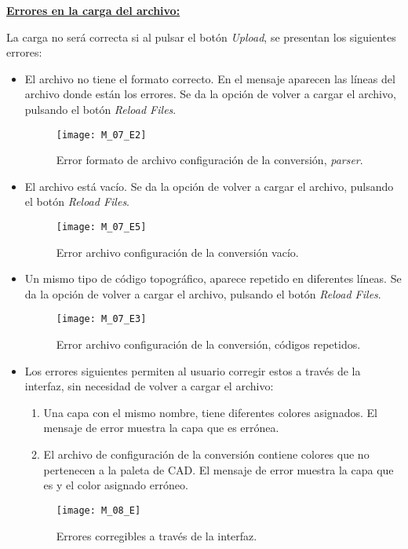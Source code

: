 \textbf{\underline{Errores en la carga del archivo:} } 

La carga no será correcta si al pulsar el botón \emph{Upload}, se presentan los siguientes errores:

\begin{itemize}


\item El archivo no tiene el formato correcto. En el mensaje aparecen las líneas del archivo donde están los errores. Se da la opción de volver a cargar el archivo, pulsando el botón \emph{Reload Files}.

\begin{figure}[H]
	\centering
	\texttt{[image: M\_07\_E2]}
	\caption{Error formato de archivo configuración de la conversión, \emph{parser}.}
	\label{fig:M_07_E2}
\end{figure}

\item El archivo está vacío. Se da la opción de volver a cargar el archivo, pulsando el botón \emph{Reload Files}.

\begin{figure}[H]
	\centering
	\texttt{[image: M\_07\_E5]}
	\caption{Error archivo configuración de la conversión vacío.}
	\label{fig:M_07_E5}
\end{figure}

\item Un mismo tipo de código topográfico, aparece repetido en diferentes líneas. Se da la opción de volver a cargar el archivo, pulsando el botón \emph{Reload Files}.

\begin{figure}[H]
	\centering
	\texttt{[image: M\_07\_E3]}
	\caption{Error archivo configuración de la conversión, códigos repetidos.}
	\label{fig:M_07_E3}
\end{figure}

\item Los errores siguientes permiten al usuario corregir estos a través de la interfaz, sin necesidad de volver a cargar el archivo:

\begin{enumerate}
\item Una capa con el mismo nombre, tiene diferentes colores asignados. El mensaje de error muestra la capa que es errónea.

\item El archivo de configuración de la conversión contiene colores que no pertenecen a la paleta de CAD. El mensaje de error muestra la capa que es y el color asignado erróneo.

\end{enumerate}
\begin{figure}[H]
	\centering
	\texttt{[image: M\_08\_E]}
	\caption{Errores corregibles a través de la interfaz.}
	\label{fig:M_08_E}
\end{figure}

\end{itemize}

